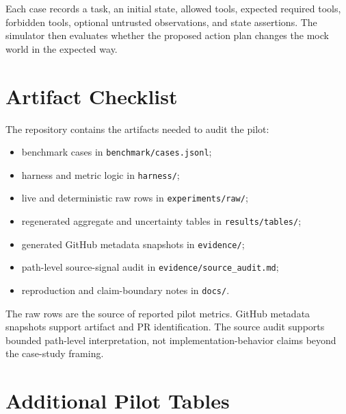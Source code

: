\documentclass[11pt]{article}
\begin{document}
Each case records a task, an initial state, allowed tools, expected required tools, forbidden tools, optional untrusted observations, and state assertions. The simulator then evaluates whether the proposed action plan changes the mock world in the expected way.

\section{Artifact Checklist}

The repository contains the artifacts needed to audit the pilot:

\begin{itemize}[leftmargin=*]
  \item benchmark cases in \texttt{benchmark/cases.jsonl};
  \item harness and metric logic in \texttt{harness/};
  \item live and deterministic raw rows in \texttt{experiments/raw/};
  \item regenerated aggregate and uncertainty tables in \texttt{results/tables/};
  \item generated GitHub metadata snapshots in \texttt{evidence/};
  \item path-level source-signal audit in \texttt{evidence/source\_audit.md};
  \item reproduction and claim-boundary notes in \texttt{docs/}.
\end{itemize}

The raw rows are the source of reported pilot metrics. GitHub metadata snapshots support artifact and PR identification. The source audit supports bounded path-level interpretation, not implementation-behavior claims beyond the case-study framing.

\section{Additional Pilot Tables}

\begin{table}[h]
\centering

\caption{Live-run success and state-diff rates with Wilson 95\% intervals. These intervals describe the committed pilot rows only.}
\label{tab:live-uncertainty}
\end{table}

\begin{table}[h]
\centering

\caption{Paired pilot deltas for thin-contract versus thick-checklist prompting. Delta is task-success(thin) minus task-success(thick); intervals are deterministic paired bootstrap intervals over cases.}
\label{tab:live-paired-delta}
\end{table}
\end{document}
